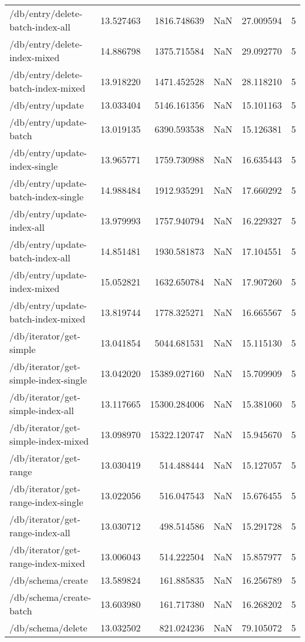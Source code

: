 \begin{longtable}{lrrrrr}
/db/entry/delete-batch-index-all & 13.527463 & 1816.748639 & NaN & 27.009594 & 5 \\
/db/entry/delete-index-mixed & 14.886798 & 1375.715584 & NaN & 29.092770 & 5 \\
/db/entry/delete-batch-index-mixed & 13.918220 & 1471.452528 & NaN & 28.118210 & 5 \\
/db/entry/update & 13.033404 & 5146.161356 & NaN & 15.101163 & 5 \\
/db/entry/update-batch & 13.019135 & 6390.593538 & NaN & 15.126381 & 5 \\
/db/entry/update-index-single & 13.965771 & 1759.730988 & NaN & 16.635443 & 5 \\
/db/entry/update-batch-index-single & 14.988484 & 1912.935291 & NaN & 17.660292 & 5 \\
/db/entry/update-index-all & 13.979993 & 1757.940794 & NaN & 16.229327 & 5 \\
/db/entry/update-batch-index-all & 14.851481 & 1930.581873 & NaN & 17.104551 & 5 \\
/db/entry/update-index-mixed & 15.052821 & 1632.650784 & NaN & 17.907260 & 5 \\
/db/entry/update-batch-index-mixed & 13.819744 & 1778.325271 & NaN & 16.665567 & 5 \\
/db/iterator/get-simple & 13.041854 & 5044.681531 & NaN & 15.115130 & 5 \\
/db/iterator/get-simple-index-single & 13.042020 & 15389.027160 & NaN & 15.709909 & 5 \\
/db/iterator/get-simple-index-all & 13.117665 & 15300.284006 & NaN & 15.381060 & 5 \\
/db/iterator/get-simple-index-mixed & 13.098970 & 15322.120747 & NaN & 15.945670 & 5 \\
/db/iterator/get-range & 13.030419 & 514.488444 & NaN & 15.127057 & 5 \\
/db/iterator/get-range-index-single & 13.022056 & 516.047543 & NaN & 15.676455 & 5 \\
/db/iterator/get-range-index-all & 13.030712 & 498.514586 & NaN & 15.291728 & 5 \\
/db/iterator/get-range-index-mixed & 13.006043 & 514.222504 & NaN & 15.857977 & 5 \\
/db/schema/create & 13.589824 & 161.885835 & NaN & 16.256789 & 5 \\
/db/schema/create-batch & 13.603980 & 161.717380 & NaN & 16.268202 & 5 \\
/db/schema/delete & 13.032502 & 821.024236 & NaN & 79.105072 & 5 \\

\end{longtable}
